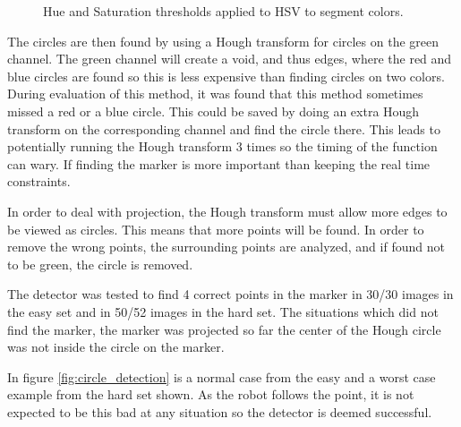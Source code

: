 \begin{figure}[h]
\caption{Hue and Saturation thresholds applied to HSV to segment colors.}
\label{fig:hsv_color_segmentation}
\end{figure}

The circles are then found by using a Hough transform for circles on the green channel.
The green channel will create a void, and thus edges, where the red and blue circles are found so this is less expensive than finding circles on two colors.
During evaluation of this method, it was found that this method sometimes missed a red or a blue circle.
This could be saved by doing an extra Hough transform on the corresponding channel and find the circle there.
This leads to potentially running the Hough transform 3 times so the timing of the function can wary.
If finding the marker is more important than keeping the real time constraints.

In order to deal with projection, the Hough transform must allow more edges to be viewed as circles.
This means that more points will be found.
In order to remove the wrong points, the surrounding points are analyzed, and if found not to be green, the circle is removed.

The detector was tested to find 4 correct points in the marker in 30/30 images in the easy set and in 50/52 images in the hard set.
The situations which did not find the marker, the marker was projected so far the center of the Hough circle was not inside the circle on the marker.

In figure \ref{fig:circle_detection} is a normal case from the easy and a worst case example from the hard set shown.
As the robot follows the point, it is not expected to be this bad at any situation so the detector is deemed successful.

